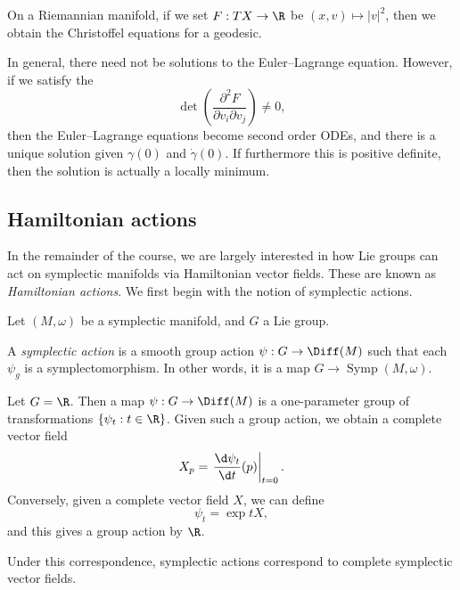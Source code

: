 \documentclass[a4paper]{article}
\DeclareMathOperator{\Symp}{Symp}
\begin{document}
\begin{eg}
  On a Riemannian manifold, if we set $F: TX \to \R$ be $(x, v) \mapsto |v|^2$, then we obtain the Christoffel equations for a geodesic.
\end{eg}

In general, there need not be solutions to the Euler--Lagrange equation. However, if we satisfy the 
\[
  \det \left(\frac{\partial^2 F}{\partial v_i \partial v_j}\right) \not= 0,
\]
then the Euler--Lagrange equations become second order ODEs, and there is a unique solution given $\gamma(0)$ and $\dot{\gamma}(0)$. If furthermore this is positive definite, then the solution is actually a locally minimum.

%
%

\subsection{Hamiltonian actions}
In the remainder of the course, we are largely interested in how Lie groups can act on symplectic manifolds via Hamiltonian vector fields. These are known as \emph{Hamiltonian actions}. We first begin with the notion of symplectic actions.

Let $(M, \omega)$ be a symplectic manifold, and $G$ a Lie group.
\begin{defi}
  A \emph{symplectic action} is a smooth group action $\psi: G \to \Diff(M)$ such that each $\psi_g$ is a symplectomorphism. In other words, it is a map $G \to \Symp(M, \omega)$.
\end{defi}

\begin{eg}
  Let $G = \R$. Then a map $\psi: G \to \Diff(M)$ is a one-parameter group of transformations $\{\psi_t: t \in \R\}$. Given such a group action, we obtain a complete vector field
  \[
    X_p = \left.\frac{\d \psi_t}{\d t}(p)\right|_{t = 0}.
  \]
  Conversely, given a complete vector field $X$, we can define
  \[
    \psi_t = \exp tX,
  \]
  and this gives a group action by $\R$.

  Under this correspondence, symplectic actions correspond to complete symplectic vector fields.
\end{eg}
\end{document}
